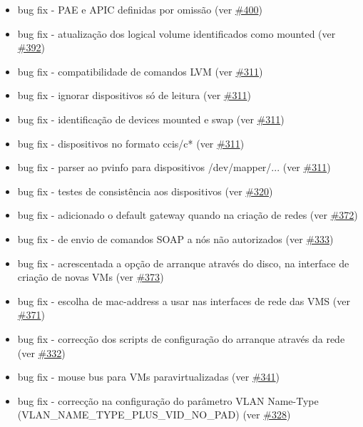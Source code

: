\begin{itemize}
	\item bug fix - PAE e APIC definidas por omissão (ver \href{https://srcmaster.eurotux.com/pm/p/etva/ticket/400}{\#400})
	\item bug fix - atualização dos logical volume identificados como mounted (ver \href{https://srcmaster.eurotux.com/pm/p/etva/ticket/392}{\#392})
	\item bug fix - compatibilidade de comandos LVM (ver \href{https://srcmaster.eurotux.com/pm/p/etva/ticket/311}{\#311})
	\item bug fix - ignorar dispositivos só de leitura (ver \href{https://srcmaster.eurotux.com/pm/p/etva/ticket/311}{\#311})
	\item bug fix - identificação de devices mounted e swap (ver \href{https://srcmaster.eurotux.com/pm/p/etva/ticket/311}{\#311})
	\item bug fix - dispositivos no formato ccis/c* (ver \href{https://srcmaster.eurotux.com/pm/p/etva/ticket/311}{\#311})
	\item bug fix - parser ao pvinfo para dispositivos /dev/mapper/... (ver \href{https://srcmaster.eurotux.com/pm/p/etva/ticket/311}{\#311})
	\item bug fix - testes de consistência aos dispositivos (ver \href{https://srcmaster.eurotux.com/pm/p/etva/ticket/320}{\#320})
	\item bug fix - adicionado o default gateway quando na criação de redes (ver \href{https://srcmaster.eurotux.com/pm/p/etva/ticket/372}{\#372})
	\item bug fix - de envio de comandos SOAP a nós não autorizados (ver \href{https://srcmaster.eurotux.com/pm/p/etva/ticket/333}{\#333})
	\item bug fix - acrescentada a opção de arranque através do disco, na interface de criação de novas VMs (ver \href{https://srcmaster.eurotux.com/pm/p/etva/ticket/373}{\#373})
	\item bug fix - escolha de mac-address a usar nas interfaces de rede das VMS (ver \href{https://srcmaster.eurotux.com/pm/p/etva/ticket/371}{\#371})
	\item bug fix - correcção dos scripts de configuração do arranque através da rede (ver \href{https://srcmaster.eurotux.com/pm/p/etva/ticket/332}{\#332})
	\item bug fix - mouse bus para VMs paravirtualizadas (ver \href{https://srcmaster.eurotux.com/pm/p/etva/ticket/341}{\#341})
	\item bug fix - correcção na configuração do parâmetro VLAN Name-Type (VLAN\_NAME\_TYPE\_PLUS\_VID\_NO\_PAD) (ver \href{https://srcmaster.eurotux.com/pm/p/etva/ticket/328}{\#328})

\end{itemize}
